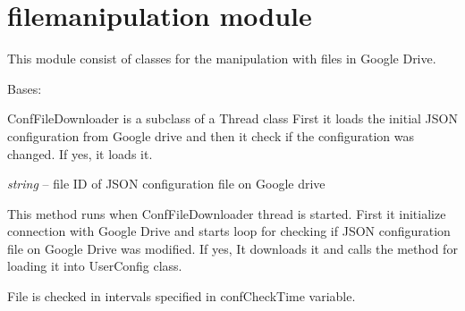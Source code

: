 \documentclass[letterpaper,10pt,english,openany]{sphinxmanual}
\begin{document}
\chapter{filemanipulation module}
\label{rpicameramon:filemanipulation-module}
This module consist of classes for the manipulation with files in Google Drive.
\label{rpicameramon:module-rpicameramon.filemanipulation}

\begin{fulllineitems}
\label{rpicameramon:rpicameramon.filemanipulation.ConfFileDownloader}
Bases: 

ConfFileDownloader is a subclass of a Thread class
First it loads the initial JSON configuration from Google drive
and then it check if the configuration was changed. If yes, it loads it.

\begin{fulllineitems}
\label{rpicameramon:rpicameramon.filemanipulation.ConfFileDownloader.filename}
\emph{string} -- file ID of JSON configuration file on Google drive

\end{fulllineitems}


\begin{fulllineitems}
\label{rpicameramon:rpicameramon.filemanipulation.ConfFileDownloader.run}
This method runs when ConfFileDownloader thread is started.
First it initialize connection with Google Drive and starts loop
for checking if JSON configuration file on Google Drive was modified.
If yes, It downloads it and calls the method for loading it into UserConfig class.

File is checked in intervals specified in confCheckTime variable.

\end{fulllineitems}



\end{fulllineitems}
\end{document}
